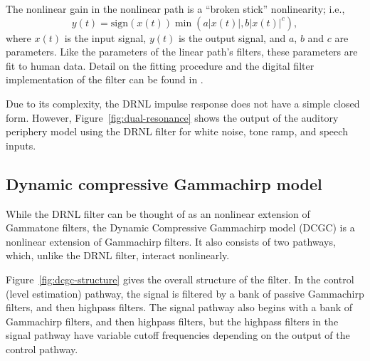 
The nonlinear gain in the nonlinear path
is a ``broken stick'' nonlinearity;
i.e.,
\begin{equation*}
  y(t) = \text{sign}(x(t)) \min(a |x(t)|, b |x(t)|^c),
\end{equation*}
where $x(t)$ is the input signal,
$y(t)$ is the output signal,
and $a$, $b$ and $c$ are parameters.
Like the parameters of the linear path's filters,
these parameters are fit to human data.
Detail on the fitting procedure
and the digital filter implementation
of the filter can be found in \citet{lopez2001}.

Due to its complexity,
the DRNL impulse response does not have a simple closed form.
However, Figure~\ref{fig:dual-resonance} shows the output
of the auditory periphery model
using the DRNL filter
for white noise, tone ramp, and speech inputs.


\subsection{Dynamic compressive Gammachirp model}

While the DRNL filter can be thought of
as an nonlinear extension of Gammatone filters,
the Dynamic Compressive Gammachirp model (DCGC)
\citep{irino2006}
is a nonlinear extension of Gammachirp filters.
It also consists of two pathways,
which, unlike the DRNL filter,
interact nonlinearly.


Figure~\ref{fig:dcgc-structure}
gives the overall structure of the filter.
In the control (level estimation) pathway,
the signal is filtered by
a bank of passive Gammachirp filters,
and then highpass filters.
The signal pathway
also begins with a bank of Gammachirp filters,
and then highpass filters,
but the highpass filters in the signal pathway
have variable cutoff frequencies
depending on the output of the control pathway.

